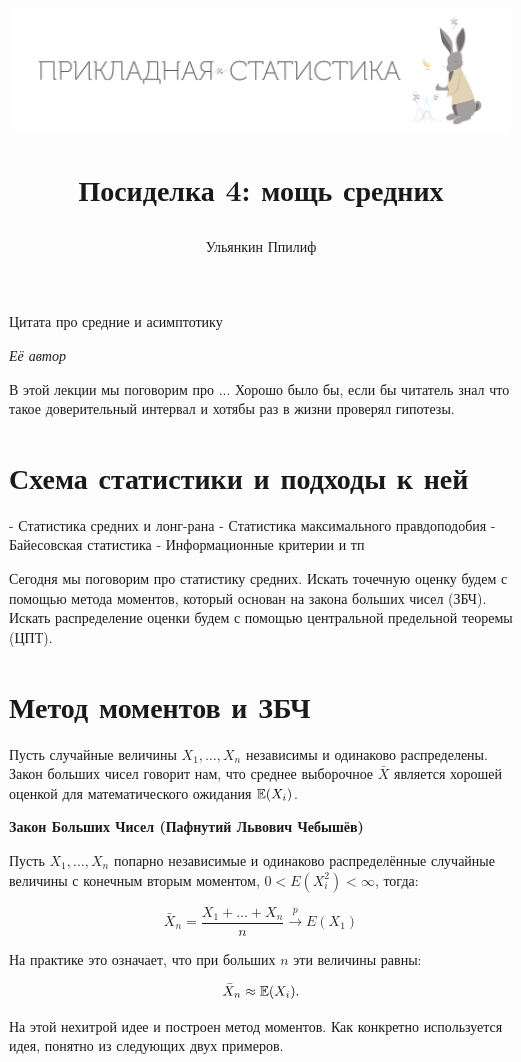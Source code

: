 \documentclass[12pt, a4paper, oneside]{article}
\title{
\begin{center} 
\includegraphics[width=0.99\textwidth]{logo.png}
\end{center}

Посиделка 4: мощь средних}
\date{ } %
\author{Ульянкин Ппилиф}
\begin{document}

\maketitle

\epigraph{Цитата про средние и асимптотику}{\textit{Её автор}}


В этой лекции мы поговорим про ... Хорошо было бы, если бы читатель знал что такое доверительный интервал и хотябы раз в жизни проверял гипотезы. 

\section{Схема статистики и подходы к ней}

- Статистика средних и лонг-рана
- Статистика максимального правдоподобия 
- Байесовская статистика
- Информационные критерии и тп 


Сегодня мы поговорим про статистику средних. Искать точечную оценку будем с помощью метода моментов, который основан на закона больших чисел (ЗБЧ). Искать распределение оценки будем с помощью центральной предельной теоремы (ЦПТ).

\section{Метод моментов и ЗБЧ}

Пусть случайные величины $X_{1}, \ldots, X_{n}$ независимы и одинаково распределены. Закон больших чисел говорит нам, что среднее выборочное $ \bar{X} $ является хорошей оценкой для математического ожидания $ \mathbb{E}(X_{i}) $.

\begin{theorem}{\textbf{Закон Больших Чисел (Пафнутий Львович Чебышёв)}}

Пусть $X_1, \ldots, X_n$ попарно независимые и одинаково распределённые случайные величины с конечным вторым моментом, $0 < E(X_i^2) < \infty$, тогда:

$$
\bar{X}_{n} = \frac{X_1 + \ldots + X_n}{n} \stackrel{p}{\longrightarrow} E(X_1)
$$
\end{theorem}

На практике это означает, что при больших $n$ эти величины равны:

\[
\bar{X}_{n}\approx \mathbb{E}(X_{i}).
\]

На этой нехитрой идее и построен метод моментов. Как конкретно используется идея, понятно из следующих двух примеров.
\end{document}
